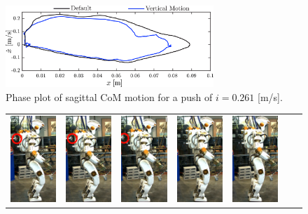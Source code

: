 \begin{figure}
\centering
\includegraphics[width=0.7\textwidth]{STYLESTUFF/valcomparephaseHW.png}
\caption{Phase plot of sagittal \ac{CoM} motion for a push of $i=0.261$ [m/s].}
\label{fig:valcomparephaseHW}
\end{figure}
\begin{figure}
\centering
  \begin{tabular}{ccccccc}
    \includegraphics[width=0.7in]{STYLESTUFF/val1zr_C} &
    \includegraphics[width=0.7in]{STYLESTUFF/val2zr_30} &
    \includegraphics[width=0.7in]{STYLESTUFF/val3zr_30} &
    \includegraphics[width=0.7in]{STYLESTUFF/val4z_30} &
    \includegraphics[width=0.7in]{STYLESTUFF/val5z_30} &

\end{tabular}
\end{figure}
